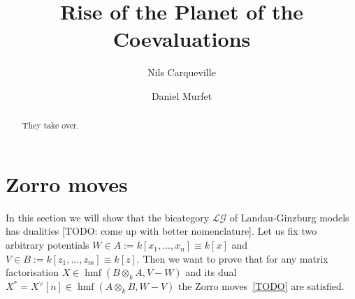 \documentclass{compositio}
\theoremstyle{definition}
\numberwithin{equation}{section}
\DeclareMathOperator{\hmf}{hmf}
\begin{document}
\title{Rise of the Planet of the Coevaluations}
\author{Nils Carqueville}
\address{Arnold Sommerfeld Center for Theoretical Physics, LMU M\"unchen \& Excellence Cluster Universe}

\author{Daniel Murfet}
\address{Department of Mathematics, UCLA}


\begin{abstract}
They take over. 
\end{abstract}

\maketitle


\section{Zorro moves}\label{sec:Zorro}

In this section we will show that the bicategory $\mathcal{LG}$ of Landau-Ginzburg models has dualities [TODO: come up with better nomenclature]. Let us fix two arbitrary potentials $W\in A:= k[x_1,\ldots,x_n]\equiv k[x]$ and $V\in B:= k[z_1,\ldots,z_m]\equiv k[z]$. Then we want to prove that for any matrix factorisation $X\in \hmf(B \otimes_k A, V-W)$ and its dual $X^* = X^\vee[n]\in \hmf(A \otimes_k B, W-V)$ the Zorro moves~\eqref{TODO} are satisfied. 
\end{document}
